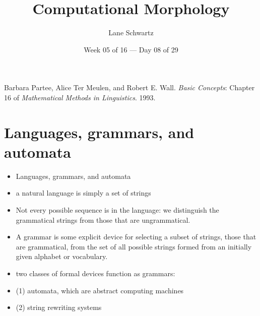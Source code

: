\documentclass{beamer}
\title[LING 490]{Computational Morphology}
\author[Week 01 of 16 --- Day 01 of 29]{Lane Schwartz}
\institute[shortinst]{University of Illinois at Urbana-Champaign}
\date{Week 05 of 16 --- Day 08 of 29}
\begin{document}


\frame{\titlepage}

	\begin{frame}
		Barbara Partee, Alice Ter Meulen, and Robert E. Wall. \textit{Basic Concepts}: Chapter 16 of \textit{Mathematical Methods in Linguistics}. 1993.
	\end{frame}


	\section{Languages, grammars, and automata}


	\begin{frame}
		\begin{itemize}
			\item Languages, grammars, and automata
			\item a natural language is simply a set of strings
		\end{itemize}
	\end{frame}


	\begin{frame}
		\begin{itemize}
			\item Not every possible sequence is in the language: we distinguish the grammatical strings from those that are ungrammatical.
		\end{itemize}
	\end{frame}


	\begin{frame}
		\begin{itemize}
			\item A grammar is some explicit device for selecting a subset of strings, those that are grammatical, from the set of all possible strings formed from an initially given alphabet or vocabulary.
		\end{itemize}
	\end{frame}


	\begin{frame}
		\begin{itemize}
			\item two classes of formal devices function as grammars:
			\item (1) automata, which are abstract computing machines
			\item (2) string rewriting systems
		\end{itemize}
	\end{frame}
\end{document}
